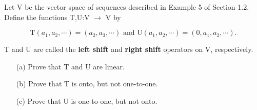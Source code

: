 Let V be the vector space of sequences described in Example 5 of Section 1.2. Define the functions T,U:V $\rightarrow$ V by

$$\mathrm{T}(a_1,a_2,\cdots) = (a_2,a_3,\cdots) \text{ and } \mathrm{U}(a_1,a_2,\cdots) = (0,a_1,a_2,\cdots).$$

T and U are called the \textbf{left shift} and \textbf{right shift} operators on V, respectively.

\begin{enumerate}
	\item[(a)] Prove that T and U are linear.
	\item[(b)] Prove that T is onto, but not one-to-one.
	\item[(c)] Prove that U is one-to-one, but not onto.
\end{enumerate}
\begin{tcolorbox}
\begin{solution}
	
\end{solution}

\end{tcolorbox}